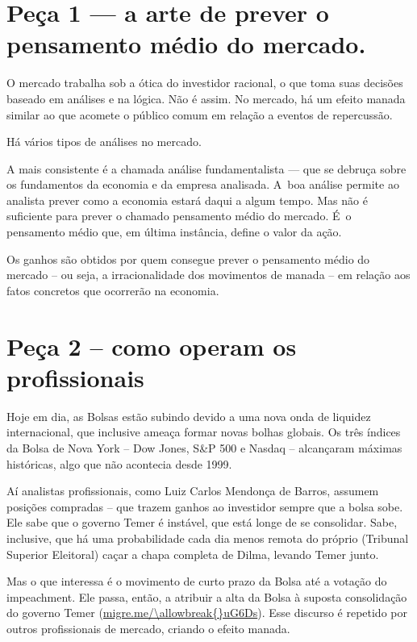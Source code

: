  

\section{Peça 1 --- a arte de prever o pensamento médio do mercado.}

O mercado trabalha sob a ótica do investidor racional, o que toma suas
decisões baseado em análises e na lógica. Não é assim. No mercado, há um
efeito manada similar ao que acomete o público comum em relação a
eventos de repercussão.

Há vários tipos de análises no mercado.

A mais consistente é a chamada análise fundamentalista --- que se
debruça sobre os fundamentos da economia e da empresa analisada. A~boa
análise permite ao analista prever como a economia estará daqui a algum
tempo. Mas não é suficiente para prever o chamado pensamento médio do
mercado. É~o pensamento médio que, em última instância, define o valor
da ação.

Os ganhos são obtidos por quem consegue prever o pensamento médio do
mercado -- ou seja, a irracionalidade dos movimentos de manada -- em
relação aos fatos concretos que ocorrerão na economia.

\section{Peça 2 -- como operam os profissionais}

Hoje em dia, as Bolsas estão subindo devido a uma nova onda de liquidez
internacional, que inclusive ameaça formar novas bolhas globais. Os três
índices da Bolsa de Nova York -- Dow Jones, S\&P 500 e Nasdaq --
alcançaram máximas históricas, algo que não acontecia desde 1999.

Aí analistas profissionais, como Luiz Carlos Mendonça de Barros, assumem
posições compradas -- que trazem ganhos ao investidor sempre que a bolsa
sobe. Ele sabe que o governo Temer é instável, que está longe de se
consolidar. Sabe, inclusive, que há uma probabilidade cada dia menos
remota do próprio  (Tribunal Superior Eleitoral) caçar a chapa
completa de Dilma, levando Temer junto.

Mas o que interessa é o movimento de curto prazo da Bolsa até a votação
do impeachment. Ele passa, então, a atribuir a alta da Bolsa à suposta
consolidação do governo Temer (\url{migre.me/\allowbreak{}uG6Ds}). Esse
discurso é repetido por outros profissionais de mercado, criando o
efeito manada.

